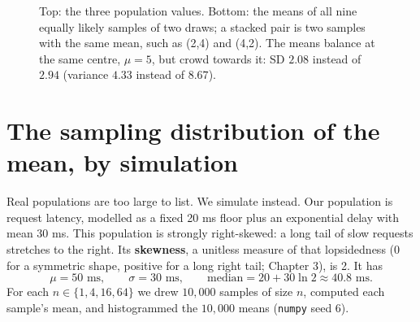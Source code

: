 \begin{figure}[H]
\centering
{}
\caption{Top: the three population values. Bottom: the means of all nine
equally likely samples of two draws; a stacked pair is two samples with the same
mean, such as (2,4) and (4,2). The means balance at the same centre, $\mu=5$, but
crowd towards it: SD $2.08$ instead of $2.94$ (variance $4.33$ instead of
$8.67$).}
\label{fig:sd-tiny}
\end{figure}

\section{The sampling distribution of the mean, by simulation}
\label{sec:sd-sim}

Real populations are too large to list. We simulate instead. Our population is
request latency, modelled as a fixed 20 ms floor plus an exponential delay with
mean 30 ms. This population is strongly right-skewed: a long tail of slow
requests stretches to the right. Its \textbf{skewness}, a unitless measure of
that lopsidedness (0 for a symmetric shape, positive for a long right tail;
Chapter 3), is 2. It has
\[
\mu=50\text{ ms},\qquad \sigma=30\text{ ms},\qquad \text{median}=20+30\ln 2\approx 40.8\text{ ms}.
\]
For each $n\in\{1,4,16,64\}$ we drew $10{,}000$ samples of size $n$, computed each
sample's mean, and histogrammed the $10{,}000$ means (\texttt{numpy} seed 6).

